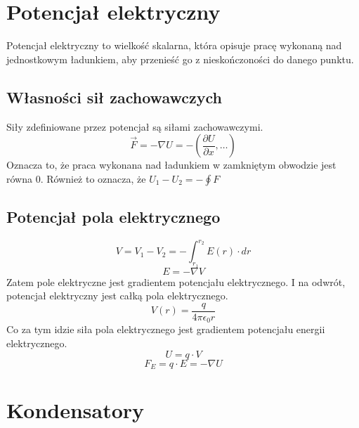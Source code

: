 \documentclass{../notatki}
\begin{document}
\section{Potencjał elektryczny}

Potencjał elektryczny to wielkość skalarna, która opisuje pracę wykonaną nad
jednostkowym ładunkiem, aby przenieść go z nieskończoności do danego punktu.

\subsection{Własności sił zachowawczych}

Siły zdefiniowane przez potencjał są siłami zachowawczymi.
$$
\vec{F} = - \nabla U = - (\frac{\partial U}{\partial x}, \dots)
$$
Oznacza to, że praca wykonana nad ładunkiem w zamkniętym obwodzie jest równa 0.
Również to oznacza, że $U_1 - U_2 = - \oint F$

\subsection{Potencjał pola elektrycznego}

$$
V = V_1 - V_2 = - \int_{r_1}^{r_2} E(r) \cdot dr
$$
$$
E = - \nabla V
$$
Zatem pole elektryczne jest gradientem potencjału elektrycznego. I na odwrót,
potencjał elektryczny jest całką pola elektrycznego.
$$
V(r) = \frac{q}{4\pi\epsilon_0 r}
$$
Co za tym idzie siła pola elektrycznego jest gradientem potencjału
energii elektrycznego.
$$
U = q \cdot V
$$
$$
F_E = q \cdot E = - \nabla U
$$

\section{Kondensatory}
\end{document}
